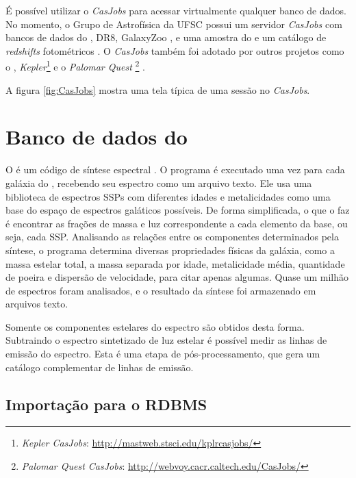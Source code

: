 É possível utilizar o {\em CasJobs} para acessar virtualmente qualquer banco de
dados. No momento, o Grupo de Astrofísica da UFSC possui um servidor {\em
CasJobs} com bancos de dados do \starlight, \SDSS DR8, GalaxyZoo
\citep{Lintott2008}, e uma amostra do \galex e um catálogo de {\em redshifts}
fotométricos \citep{OMill2011}. O {\em CasJobs} também foi adotado por outros
projetos como o \galex, {\em Kepler}\footnote{{\em Kepler CasJobs}:
\url{http://mastweb.stsci.edu/kplrcasjobs/}} e o {\em Palomar Quest
}\footnote{{\em Palomar Quest CasJobs}:
\url{http://webvoy.cacr.caltech.edu/CasJobs/}} \citep{Djorgovski2008}.

A figura \ref{fig:CasJobs} mostra uma tela típica de uma sessão no {\em
CasJobs}.



\section{Banco de dados do \STARLIGHT}

O \starlight é um código de síntese espectral \citep{CidFernandes2005}. O
programa é executado uma vez para cada galáxia do \SDSS, recebendo seu espectro
como um arquivo texto. Ele usa uma biblioteca de espectros SSPs com diferentes
idades e metalicidades como uma base do espaço de espectros galáticos possíveis.
De forma simplificada, o que o \starlight faz é encontrar as frações de massa e
luz correspondente a cada elemento da base, ou seja, cada SSP. Analisando as
relações entre os componentes determinados pela síntese, o programa determina
diversas propriedades físicas da galáxia, como a massa estelar total, a massa
separada por idade, metalicidade média, quantidade de poeira e dispersão de
velocidade, para citar apenas algumas. Quase um milhão de espectros foram
analisados, e o resultado da síntese foi armazenado em arquivos texto.

Somente os componentes estelares do espectro são obtidos desta forma. Subtraindo
o espectro sintetizado de luz estelar é possível medir as linhas de emissão do
espectro. Esta é uma etapa de pós-processamento, que gera um catálogo
complementar de linhas de emissão.

\subsection{Importação para o RDBMS}

